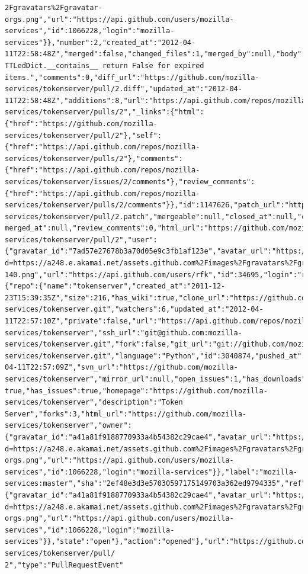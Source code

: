 \documentclass[a4paper,10pt]{article}
\begin{document}
\begin{lstlisting}
2Fgravatars%2Fgravatar-orgs.png","url":"https://api.github.com/users/mozilla-services","id":1066228,"login":"mozilla-services"}},"number":2,"created_at":"2012-04-11T22:58:48Z","merged":false,"changed_files":1,"merged_by":null,"body":"","title":"Make TTLedDict.__contains__ return False for expired items.","comments":0,"diff_url":"https://github.com/mozilla-services/tokenserver/pull/2.diff","updated_at":"2012-04-11T22:58:48Z","additions":8,"url":"https://api.github.com/repos/mozilla-services/tokenserver/pulls/2","_links":{"html":{"href":"https://github.com/mozilla-services/tokenserver/pull/2"},"self":{"href":"https://api.github.com/repos/mozilla-services/tokenserver/pulls/2"},"comments":{"href":"https://api.github.com/repos/mozilla-services/tokenserver/issues/2/comments"},"review_comments":{"href":"https://api.github.com/repos/mozilla-services/tokenserver/pulls/2/comments"}},"id":1147626,"patch_url":"https://github.com/mozilla-services/tokenserver/pull/2.patch","mergeable":null,"closed_at":null,"commits":1,"
merged_at":null,"review_comments":0,"html_url":"https://github.com/mozilla-services/tokenserver/pull/2","user":{"gravatar_id":"7ad57e27678b3a70d05e9c3fb1af123e","avatar_url":"https://secure.gravatar.com/avatar/7ad57e27678b3a70d05e9c3fb1af123e?d=https://a248.e.akamai.net/assets.github.com%2Fimages%2Fgravatars%2Fgravatar-140.png","url":"https://api.github.com/users/rfk","id":34695,"login":"rfk"},"deletions":0,"base":{"repo":{"name":"tokenserver","created_at":"2011-12-23T15:39:35Z","size":216,"has_wiki":true,"clone_url":"https://github.com/mozilla-services/tokenserver.git","watchers":6,"updated_at":"2012-04-11T22:57:10Z","private":false,"url":"https://api.github.com/repos/mozilla-services/tokenserver","ssh_url":"git@github.com:mozilla-services/tokenserver.git","fork":false,"git_url":"git://github.com/mozilla-services/tokenserver.git","language":"Python","id":3040874,"pushed_at":"2012-04-11T22:57:09Z","svn_url":"https://github.com/mozilla-services/tokenserver","mirror_url":null,"open_issues":1,"has_downloads":
true,"has_issues":true,"homepage":"https://github.com/mozilla-services/tokenserver","description":"Token Server","forks":3,"html_url":"https://github.com/mozilla-services/tokenserver","owner":{"gravatar_id":"a41a81f9188770933a4b54382c29cae4","avatar_url":"https://secure.gravatar.com/avatar/a41a81f9188770933a4b54382c29cae4?d=https://a248.e.akamai.net/assets.github.com%2Fimages%2Fgravatars%2Fgravatar-orgs.png","url":"https://api.github.com/users/mozilla-services","id":1066228,"login":"mozilla-services"}},"label":"mozilla-services:master","sha":"2ef48e3d3e57030597175149703a362ed9794335","ref":"master","user":{"gravatar_id":"a41a81f9188770933a4b54382c29cae4","avatar_url":"https://secure.gravatar.com/avatar/a41a81f9188770933a4b54382c29cae4?d=https://a248.e.akamai.net/assets.github.com%2Fimages%2Fgravatars%2Fgravatar-orgs.png","url":"https://api.github.com/users/mozilla-services","id":1066228,"login":"mozilla-services"}},"state":"open"},"action":"opened"},"url":"https://github.com/mozilla-services/tokenserver/pull/
2","type":"PullRequestEvent"
\end{lstlisting}
\end{document}
